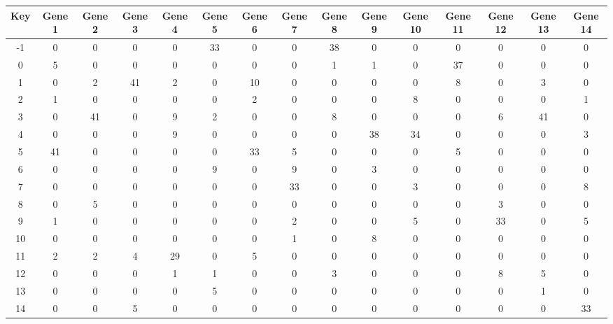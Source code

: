 \begin{tabular}{|c|c|c|c|c|c|c|c|c|c|c|c|c|c|c|}
\hline
Key & Gene 1 & Gene 2 & Gene 3 & Gene 4 & Gene 5 & Gene 6 & Gene 7 & Gene 8 & Gene 9 & Gene 10 & Gene 11 & Gene 12 & Gene 13 & Gene 14 \\
\hline
-1 & 0 & 0 & 0 & 0 & 33 & 0 & 0 & 38 & 0 & 0 & 0 & 0 & 0 & 0 \\
0 & 5 & 0 & 0 & 0 & 0 & 0 & 0 & 1 & 1 & 0 & 37 & 0 & 0 & 0 \\
1 & 0 & 2 & 41 & 2 & 0 & 10 & 0 & 0 & 0 & 0 & 8 & 0 & 3 & 0 \\
2 & 1 & 0 & 0 & 0 & 0 & 2 & 0 & 0 & 0 & 8 & 0 & 0 & 0 & 1 \\
3 & 0 & 41 & 0 & 9 & 2 & 0 & 0 & 8 & 0 & 0 & 0 & 6 & 41 & 0 \\
4 & 0 & 0 & 0 & 9 & 0 & 0 & 0 & 0 & 38 & 34 & 0 & 0 & 0 & 3 \\
5 & 41 & 0 & 0 & 0 & 0 & 33 & 5 & 0 & 0 & 0 & 5 & 0 & 0 & 0 \\
6 & 0 & 0 & 0 & 0 & 9 & 0 & 9 & 0 & 3 & 0 & 0 & 0 & 0 & 0 \\
7 & 0 & 0 & 0 & 0 & 0 & 0 & 33 & 0 & 0 & 3 & 0 & 0 & 0 & 8 \\
8 & 0 & 5 & 0 & 0 & 0 & 0 & 0 & 0 & 0 & 0 & 0 & 3 & 0 & 0 \\
9 & 1 & 0 & 0 & 0 & 0 & 0 & 2 & 0 & 0 & 5 & 0 & 33 & 0 & 5 \\
10 & 0 & 0 & 0 & 0 & 0 & 0 & 1 & 0 & 8 & 0 & 0 & 0 & 0 & 0 \\
11 & 2 & 2 & 4 & 29 & 0 & 5 & 0 & 0 & 0 & 0 & 0 & 0 & 0 & 0 \\
12 & 0 & 0 & 0 & 1 & 1 & 0 & 0 & 3 & 0 & 0 & 0 & 8 & 5 & 0 \\
13 & 0 & 0 & 0 & 0 & 5 & 0 & 0 & 0 & 0 & 0 & 0 & 0 & 1 & 0 \\
14 & 0 & 0 & 5 & 0 & 0 & 0 & 0 & 0 & 0 & 0 & 0 & 0 & 0 & 33 \\
\hline
\end{tabular}